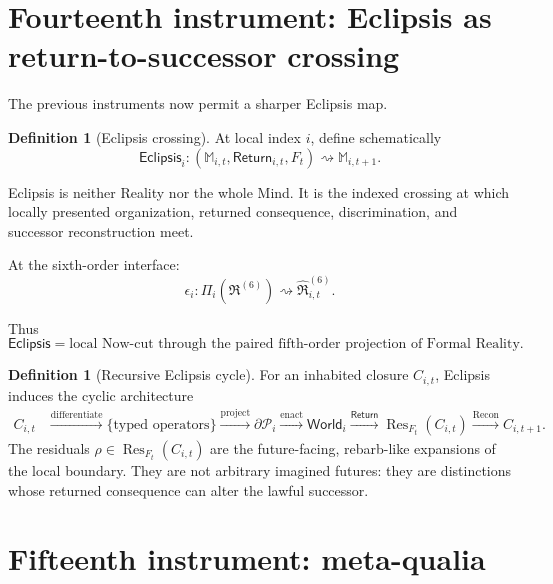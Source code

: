 \documentclass[10pt]{article}
\theoremstyle{pe}
\theoremstyle{definition}
\newtheorem{definition}[theorem]{Definition}
\newcommand{\Res}{\operatorname{Res}}
\newcommand{\Recon}{\operatorname{Recon}}
\newcommand{\World}{\mathsf{World}}
\newcommand{\Return}{\mathsf{Return}}
\newcommand{\Eclipsis}{\mathsf{Eclipsis}}
\begin{document}
\section{Fourteenth instrument: Eclipsis as return-to-successor crossing}

The previous instruments now permit a sharper Eclipsis map.

\begin{definition}[Eclipsis crossing]
At local index \(i\), define schematically
\begin{equation}\label{eq:eclipsis-crossing}
  \boxed{
  \Eclipsis_i:
  (\mathbb M_{i,t},\Return_{i,t},F_t)
  \rightsquigarrow
  \mathbb M_{i,t+1}.
  }
\end{equation}
\end{definition}

Eclipsis is neither Reality nor the whole Mind.  It is the indexed crossing at which locally presented organization, returned consequence, discrimination, and successor reconstruction meet.

At the sixth-order interface:
\[
  \epsilon_i:
  \Pi_i(\mathfrak R^{(6)})
  \rightsquigarrow
  \widehat{\mathfrak R}^{(6)}_{i,t}.
\]

Thus
\[
  \boxed{
  \Eclipsis
  =
  \text{local Now-cut through the paired fifth-order projection of Formal Reality}.
  }
\]

\begin{definition}[Recursive Eclipsis cycle]
For an inhabited closure \(C_{i,t}\), Eclipsis induces the cyclic architecture
\begin{equation}\label{eq:eclipsis-cycle}
\boxed{
\begin{aligned}
C_{i,t}
&\xrightarrow{\text{differentiate}}
\{\text{typed operators}\}
\xrightarrow{\text{project}}
\partial\mathcal P_i
\xrightarrow{\text{enact}}
\World_i
\xrightarrow{\Return}
\Res_{F_t}(C_{i,t})
\xrightarrow{\Recon}
C_{i,t+1}.
\end{aligned}}
\end{equation}
The residuals \(\rho\in\Res_{F_t}(C_{i,t})\) are the future-facing, rebarb-like expansions of the local boundary.  They are not arbitrary imagined futures: they are distinctions whose returned consequence can alter the lawful successor.
\end{definition}

\section{Fifteenth instrument: meta-qualia}
\end{document}
